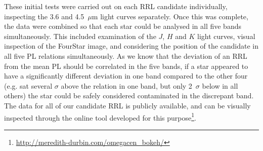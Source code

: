\documentclass[a4paper,fleqn,usenatbib]{mnras}
\begin{document}
These initial tests were carried out on each RRL candidate individually, inspecting the 3.6 and 4.5~$\mu$m light curves separately. Once this was complete, the data were combined so that each star could be analysed in all five bands simultaneously. This included examination of the $J$, $H$ and $K$ light curves, visual inspection of the FourStar image, and considering the position of the candidate in all five PL relations simultaneously. As we know that the deviation of an RRL from the mean PL should be correlated in the five bands, if a star appeared to have a significantly different deviation in one band compared to the other four (e.g. sat several $\sigma$ above the relation in one band, but only 2~$\sigma$ below in all others) the star could be safely considered contaminated in the discrepant band. The data for all of our candidate RRL is publicly available, and can be visually inspected through the online tool developed for this purpose\footnote{\href{http://meredith-durbin.com/omegacen\_bokeh/}{http://meredith-durbin.com/omegacen\_bokeh/}}.
\end{document}
